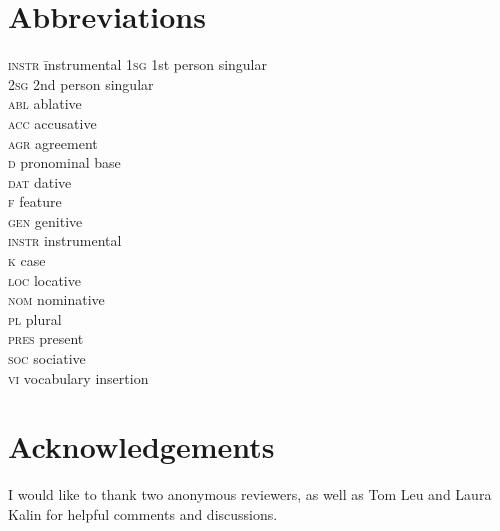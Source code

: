 \documentclass[output=paper]{langscibook}
\begin{document}
\section*{Abbreviations}
\begin{multicols}{2}
\begin{tabbing}
\textsc{instr}\hspace{.5ex} \= instrumental\kill
\textsc{1sg} \> 1st person singular         \\
\textsc{2sg} \> 2nd person singular         \\
\textsc{abl} \> ablative                 \\
\textsc{acc} \> accusative         \\
\textsc{agr} \> agreement      \\
\textsc{d} \> pronominal base \\
\textsc{dat} \> dative             \\
\textsc{f}   \> feature          \\
\textsc{gen} \> genitive\\
\textsc{instr} \> instrumental         \\
 \textsc{k}     \> case                 \\
 \textsc{loc}   \> locative             \\
 \textsc{nom}   \> nominative           \\
 \textsc{pl}    \> plural               \\
 \textsc{pres}  \> present              \\
 \textsc{soc}   \> sociative            \\
 \textsc{vi}    \> vocabulary insertion
\end{tabbing}
\end{multicols}

\section*{Acknowledgements}
I would like to thank two anonymous reviewers, as well as Tom Leu and Laura Kalin for helpful comments and discussions.

\printbibliography[heading=subbibliography,notkeyword=this]
\end{document}
